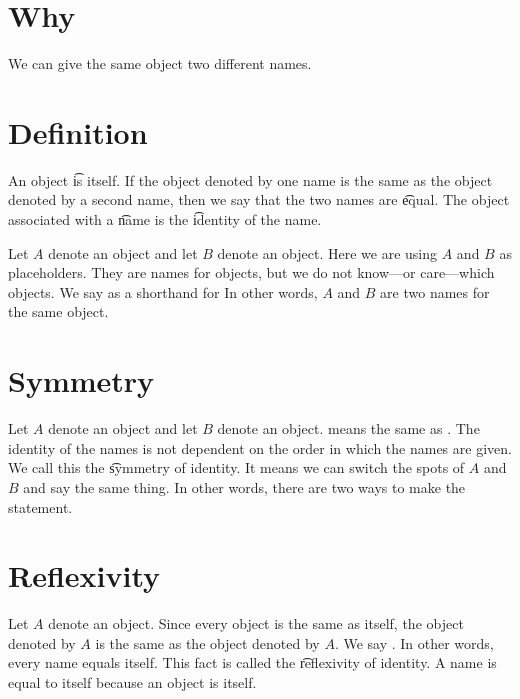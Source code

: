 
\section*{Why}

We can give the same object two different names.

\section*{Definition}

An object \t{is} itself.
If the object denoted by one name is the same as the object denoted by a second name, then we say that the two names are \t{equal}.
The object associated with a \t{name} is the \t{identity} of the name.

Let $A$ denote an object and let $B$ denote an object.
Here we are using $A$ and $B$ as placeholders.
They are names for objects, but we do not know---or care---which objects.
We say  as a shorthand for 
In other words, $A$ and $B$ are two names for the same object.

\section*{Symmetry}

Let $A$ denote an object and let $B$ denote an object.
 means the same as .
The identity of the names is not dependent on the order in which the names are given.
We call this the \t{symmetry of identity}.
It means we can switch the spots of $A$ and $B$ and say the same thing.
In other words, there are two ways to make the statement.


\section*{Reflexivity}

Let $A$ denote an object.
Since every object is the same as itself, the object denoted by $A$ is the same as the object denoted by $A$.
We say .
In other words, every name equals itself.
This fact is called the \t{reflexivity of identity}.
A name is equal to itself because an object is itself.

